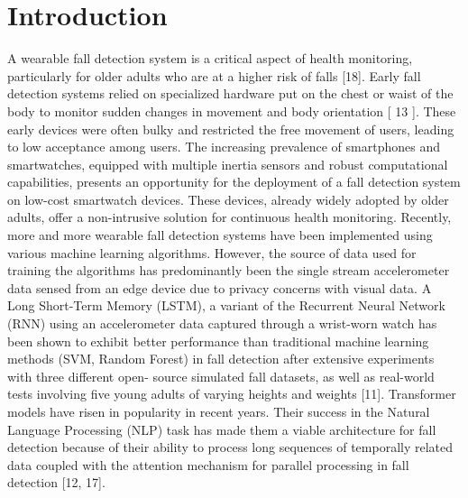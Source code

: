 \documentclass[conference]{IEEEtran}
\begin{document}
\section{Introduction}
A wearable fall detection system is a critical aspect of health monitoring, particularly
for older adults who are at a higher risk of falls [18]. Early fall detection systems relied on specialized hardware put on the chest or waist of the body to monitor sudden changes in movement and body orientation [ 13 ]. These early devices were often bulky and
restricted the free movement of users, leading to low acceptance among users. The increasing prevalence of smartphones and
smartwatches, equipped with multiple inertia sensors and robust computational capabilities, presents an opportunity for the deployment of a fall detection system on low-cost smartwatch 
devices. These devices, already widely adopted by older adults, offer a non-intrusive solution for continuous health monitoring.
Recently, more and more wearable fall detection systems have been implemented using various machine learning algorithms. However,
the source of data used for training the algorithms has predominantly been the
single stream accelerometer data sensed from an edge device due to privacy concerns with visual data. A Long Short-Term Memory (LSTM), a
variant of the Recurrent Neural Network (RNN) using an accelerometer
data captured through a wrist-worn watch has been shown to exhibit
better performance than traditional machine learning methods (SVM, Random Forest) in
fall detection after extensive experiments with three different open-
source simulated fall datasets, as well as real-world tests involving
five young adults of varying heights and weights [11].
Transformer models have risen in popularity in recent years. Their
success in the Natural Language Processing (NLP) task has made
them a viable architecture for fall detection because  of their ability 
to process long
sequences of temporally related data coupled with the attention mechanism for parallel processing 
in fall detection [12, 17].
\end{document}
